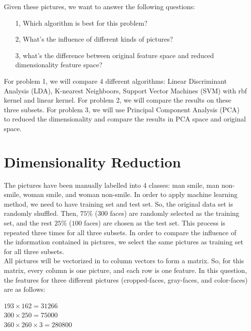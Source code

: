 \documentclass[11pt,letterpaper]{article}
\begin{document}
Given these pictures, we want to answer the following questions:

\begin{enumerate}
\item[1, ] Which algorithm is best for this problem?
\item[2, ] What's the influence of different kinds of pictures?
\item[3, ] what's the difference between original feature space and reduced dimensionality feature space?
\end{enumerate}

For problem 1, we will compare 4 different algorithms: Linear Discriminant Analysis (LDA), K-nearest Neighboors, Support Vector Machines (SVM) with rbf kernel and linear kernel. For problem 2, we will compare the results on these three subsets. For problem 3, we will use Principal Component Analysis (PCA) to reduced the dimensionality and compare the results in PCA space and original space.\\

\section{Dimensionality Reduction}

The pictures have been manually labelled into 4 classes: man smile, man non-smile, woman smile, and woman non-smile. In order to apply machine learning method, we need to have training set and test set. So, the original data set is randomly shuffled. Then, $75\%$ ($300$ faces) are randomly selected as the training set, and the rest $25\%$ ($100$ faces) are chosen as the test set. This process is repeated three times for all three subsets. In order to compare the influence of the information contained in pictures, we select the same pictures as training set for all three subsets.\\

All pictures will be vectorized in to column vectors to form a matrix. So, for this matrix, every column is one picture, and each row is one feature. In this question, the features for three different pictures (cropped-faces, gray-faces, and color-faces) are as follows:\\
\begin{center}
$193 \times 162 = 31266$\\
$300 \times 250 = 75000$\\
$360 \times 260 \times 3 = 280800$\\
\end{center}
\end{document}

